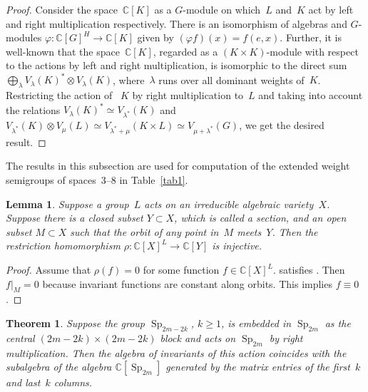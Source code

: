 \documentclass[12pt]{amsart}
\newtheorem{theorem}{Theorem}
\newtheorem{lemma}{Lemma}
\theoremstyle{definition}
\theoremstyle{remark}
\begin{document}
\begin{proof}
Consider the space~$\mathbb{C}[K]$ as a $G$-module on which~$L$
and~$K$ act by left and right multiplication respectively. There is
an isomorphism of algebras and $G$-modules $\varphi\colon
\mathbb{C}[G]^H \to \mathbb{C}[K]$ given by $(\varphi f)(x)=f(e,x)$.
Further, it is well-known that the space~$\mathbb{C}[K]$, regarded
as a $(K\times K)$-module with respect to the actions by left and
right multiplication, is isomorphic to the direct sum $\bigoplus
\limits_\lambda V_\lambda(K)^*\otimes V_\lambda(K)$, where~$\lambda$
runs over all dominant weights of~$K$. Restricting the action of
~$K$ by right multiplication to~$L$ and taking into account the
relations $V_\lambda(K)^*\simeq V_{\lambda^*}(K)$ and
$V_{\lambda^*}(K)\otimes V_\mu(L) \simeq V_{\lambda^*+\mu}(K\times
L) \simeq V_{\mu+\lambda^*}(G)$, we get the desired result.
\end{proof}

{}{}
\label{ssec2.2} The results in this subsection are used for
computation of the extended weight semigroups of spaces~3--8 in
Table~\ref{tab1}.

\begin{lemma}
\label{lem1} Suppose a group~$L$ acts on an irreducible algebraic
variety~$X$. Suppose there is a closed subset $Y\subset X$, which is
called a section, and an open subset $M\subset X$ such that the
orbit of any point in~$M$ meets~$Y$. Then the restriction
homomorphism $\rho\colon \mathbb{C}[X]^L\to\mathbb{C}[Y]$ is
injective.
\end{lemma}

\begin{proof}
Assume that $\rho(f)=0$ for some function $f\in\mathbb{C}[X]^L$.
satisfies . Then $f\big|_M=0$ because invariant functions are
constant along orbits. This implies $f\equiv 0$.
\end{proof}

\begin{theorem}
\label{th6} Suppose the group ${\operatorname{Sp}}_{2m-2k}$, $k{\geqslant} 1$, is embedded
in ${\operatorname{Sp}}_{2m}$ as the central $(2m-2k)\times(2m-2k)$ block and acts
on ${\operatorname{Sp}}_{2m}$ by right multiplication. Then the algebra of
invariants of this action coincides with the subalgebra of the
algebra $\mathbb{C}[{\operatorname{Sp}}_{2m}]$ generated by the matrix entries of
the first~$k$ and last~$k$ columns.
\end{theorem}
\end{document}
